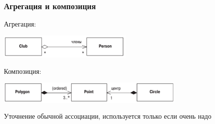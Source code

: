 \documentclass[xetex,mathserif,serif]{beamer}
\begin{document}
    \begin{frame}
        \frametitle{Агрегация и композиция}
        Агрегация:
        \begin{center}
            \includegraphics[width=0.5\textwidth]{aggregations.png}
        \end{center}
        Композиция:
        \begin{center}
            \includegraphics[width=0.7\textwidth]{compositions.png}
        \end{center}
        Уточнение обычной ассоциации, используется только если очень надо
    \end{frame}
\end{document}
